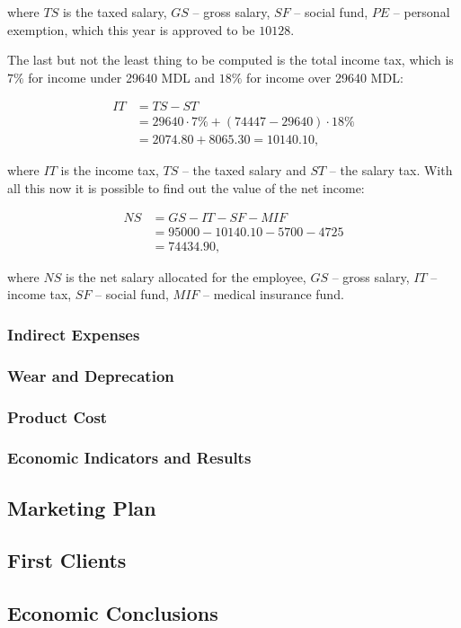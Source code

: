 \noindent where $TS$ is the taxed salary, $GS$ -- gross salary, $SF$ -- social
fund, $PE$ -- personal exemption, which this year is approved to be $10128$.

The last but not the least thing to be computed is the total income tax, which
is $7\%$ for income under 29640 MDL and $18\%$ for income over 29640 MDL:

\begin{equation}
\begin{split}
 IT &= TS - ST \\
      &= 29640 \cdot 7\% + (74447 - 29640) \cdot 18\% \\
      & = 2074.80 + 8065.30 = 10140.10,
 \end{split}
\end{equation}

\noindent where $IT$ is the income tax, $TS$ -- the taxed salary and $ST$ --
the salary tax. With all this now it is possible to find out the value of the
net income:

\begin{equation}
\begin{split}
 NS &= GS - IT - SF - MIF \\
            &= 95000 - 10140.10 - 5700 - 4725 \\
            &= 74434.90,
\end{split}
\end{equation}

\noindent where $NS$ is the net salary allocated for the employee, $GS$ -- gross salary, $IT$ -- income
tax, $SF$ -- social fund, $MIF$ -- medical insurance fund.


\subsubsection{Indirect Expenses}

\subsubsection{Wear and Deprecation}

\subsubsection{Product Cost}

\subsubsection{Economic Indicators and Results}

\subsection{Marketing Plan}

\subsection{First Clients}

\subsection{Economic Conclusions}






\clearpage
